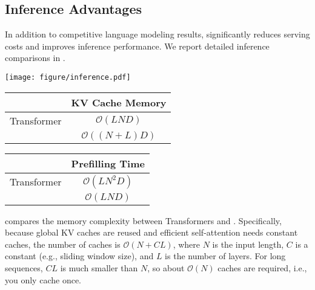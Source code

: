 \subsection{Inference Advantages}
\label{sec:infer:adv}

In addition to competitive language modeling results, \our{} significantly reduces serving costs and improves inference performance.
We report detailed inference comparisons in .

\begin{table*}[t]  
\centering  
\begin{minipage}[b]{0.52\linewidth}  
\centering  
\captionsetup{type=figure}
\texttt{[image: figure/inference.pdf]}
\caption{\our{} Inference.
\textbf{Prefill}: encode input tokens in parallel.
\textbf{Generation}: decode output tokens one by one.
The computation flow enables prefilling to early exit without changing the final output, thereby significantly speeding up the prefill stage.
}
\label{fig:arch:inference}
\end{minipage}
\hfill  
\begin{minipage}[b]{0.47\linewidth}
\centering
\begin{tabular}{lc}
\toprule
& \textbf{KV Cache Memory}  \\
\midrule
Transformer & $\mathcal{O}(LND)$ \\
\our{} & $\mathcal{O}((N+L)D)$ \\
\bottomrule
\end{tabular}
\caption{Inference memory complexity of KV caches. $N, L, D$ are the sequence length, number of layers, and hidden dimension.}
\label{tbl:complexity:memory}
\begin{tabular}{lc}
\toprule
& \textbf{Prefilling Time} \\
\midrule
Transformer & $\mathcal{O}(LN^2D)$ \\
\our{} & $\mathcal{O}(LND)$ \\
\bottomrule
\end{tabular}
\caption{Prefilling time complexity of attention modules. $N, L, D$ are the same as above.}  
\label{tbl:complexity:prefill}
\end{minipage}
\end{table*}  

 compares the memory complexity between Transformers and \our{}.
Specifically, because global KV caches are reused and efficient self-attention needs constant caches, the number of caches is $\mathcal{O}(N + CL)$, where $N$ is the input length, $C$ is a constant (e.g., sliding window size), and $L$ is the number of layers.
For long sequences, $CL$ is much smaller than $N$, so about $\mathcal{O}(N)$ caches are required, i.e., you only cache once.

